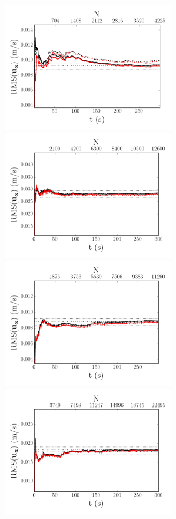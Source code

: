 \documentclass[12pt,oneside,a4paper]{article}
\begin{document}
\begin{figure}
\centering
\includegraphics[width=7.5cm]{images/LDA_timeDependenceImages/4hz_x_400_z_1_RMSux.png}\hfill
\includegraphics[width=7.5cm]{images/LDA_timeDependenceImages/8hz_x_400_z_1_RMSux.png}\\
\includegraphics[width=7.5cm]{images/LDA_timeDependenceImages/4hz_x_400_z_15_RMSux.png}\hfill
\includegraphics[width=7.5cm]{images/LDA_timeDependenceImages/8hz_x_400_z_15_RMSux.png}\\

\end{figure}
\end{document}
